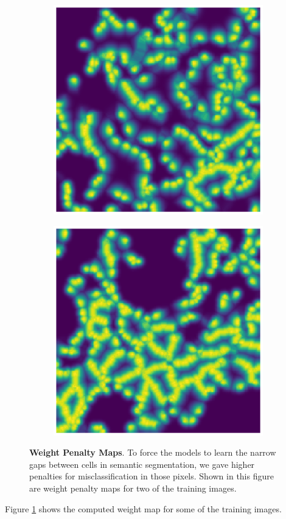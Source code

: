 \documentclass[journal]{IEEEtran}
\begin{document}
\begin{figure}
\centering
\begin{subfigure}[b]{0.45\linewidth}
\includegraphics[width=\linewidth]{weights/110082-wmap.eps}
\end{subfigure}
\begin{subfigure}[b]{0.45\linewidth}
\includegraphics[width=\linewidth]{weights/110115-wmap.eps}
\end{subfigure}
\caption{\textbf{Weight Penalty Maps}. To force the models to learn the narrow gaps between cells in semantic segmentation, we gave higher penalties for misclassification in those pixels. Shown in this figure are weight penalty maps for two of the training images.}
\label{fig:weight_map}
\end{figure}
Figure \ref{fig:weight_map} shows the computed weight map for some of the training images.
\end{document}
